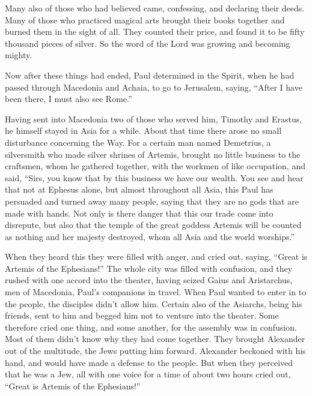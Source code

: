 {Many also of those who had believed came, confessing, and declaring their deeds.
Many of those who practiced magical arts brought their books together and burned them in the sight of all. They counted their price, and found it to be fifty thousand pieces of silver.
So the word of the Lord was growing and becoming mighty.
\par }{\PP {}Now after these things had ended, Paul determined in the Spirit, when he had passed through Macedonia and Achaia, to go to Jerusalem, saying, “After I have been there, I must also see Rome.”
\par }{\PP {}Having sent into Macedonia two of those who served him, Timothy and Erastus, he himself stayed in Asia for a while.
About that time there arose no small disturbance concerning the Way.
For a certain man named Demetrius, a silversmith who made silver shrines of Artemis, brought no little business to the craftsmen,
whom he gathered together, with the workmen of like occupation, and said, “Sirs, you know that by this business we have our wealth.
You see and hear that not at Ephesus alone, but almost throughout all Asia, this Paul has persuaded and turned away many people, saying that they are no gods that are made with hands.
Not only is there danger that this our trade come into disrepute, but also that the temple of the great goddess Artemis will be counted as nothing and her majesty destroyed, whom all Asia and the world worships.”
\par }{\PP {}When they heard this they were filled with anger, and cried out, saying, “Great is Artemis of the Ephesians!”
The whole city was filled with confusion, and they rushed with one accord into the theater, having seized Gaius and Aristarchus, men of Macedonia, Paul’s companions in travel.
When Paul wanted to enter in to the people, the disciples didn’t allow him.
Certain also of the Asiarchs, being his friends, sent to him and begged him not to venture into the theater.
Some therefore cried one thing, and some another, for the assembly was in confusion. Most of them didn’t know why they had come together.
They brought Alexander out of the multitude, the Jews putting him forward. Alexander beckoned with his hand, and would have made a defense to the people.
But when they perceived that he was a Jew, all with one voice for a time of about two hours cried out, “Great is Artemis of the Ephesians!”
}

